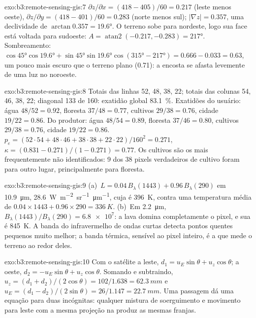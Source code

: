 \begin{solution}{exo:b3:remote-sensing-gis:7}
$\partial z/\partial x = (418 - 405)/60 = 0.217$ (leste menos oeste),
$\partial z/\partial y = (418 - 401)/60 = 0.283$ (norte menos sul);
$|\nabla z| = 0.357$, uma declividade de $\arctan 0.357 = \ang{19.6}$. O terreno
sobe para nordeste, logo sua face está voltada para sudoeste: $A =
\operatorname{atan2}(-0.217, -0.283) = \ang{217}$. Sombreamento: $\cos\ang{45}
\cos\ang{19.6} + \sin\ang{45}\sin\ang{19.6}\cos(\ang{315} - \ang{217}) =
0.666 - 0.033 = 0.63$, um pouco mais escuro que o terreno plano (0.71): a
encosta se afasta levemente de uma luz no noroeste.
\end{solution}

\begin{solution}{exo:b3:remote-sensing-gis:8}
Totais das linhas 52, 48, 38, 22; totais das colunas 54, 46, 38, 22; diagonal 133 de
160: exatidão global \qty{83.1}{\percent}. Exatidões do usuário: água
$48/52 = 0.92$, floresta $37/48 = 0.77$, cultivos $29/38 = 0.76$, cidade
$19/22 = 0.86$. Do produtor: água $48/54 = 0.89$, floresta $37/46 = 0.80$,
cultivos $29/38 = 0.76$, cidade $19/22 = 0.86$. $p_e = (52\cdot54 + 48\cdot46 +
38\cdot38 + 22\cdot22)/160^2 = 0.271$, $\kappa = (0.831 - 0.271)/(1 -
0.271) = 0.77$. Os cultivos são os mais frequentemente não identificados: 9 dos 38 pixels verdadeiros de cultivo
foram para outro lugar, principalmente para floresta.
\end{solution}

\begin{solution}{exo:b3:remote-sensing-gis:9}
(a)~$L = 0.04\,B_\lambda(1443) + 0.96\,B_\lambda(290)$ em
\qty{10.9}{\micro\metre}, \qty{28.6}{W.m^{-2}.sr^{-1}.\micro\metre^{-1}},
cuja  é \qty{396}{K}, contra uma temperatura média de
$0.04\times1443 + 0.96\times290 = \qty{336}{K}$. (b)~Em
\qty{2.2}{\micro\metre}, $B_\lambda(1443)/B_\lambda(290) = \num{6.8e7}$:
a lava domina completamente o pixel, e sua  é
\qty{845}{K}. A banda do infravermelho de ondas curtas detecta pontos quentes pequenos
muito melhor; a banda térmica, sensível ao pixel inteiro, é a que
mede o terreno ao redor deles.
\end{solution}

\begin{solution}{exo:b3:remote-sensing-gis:10}
Com o satélite a leste, $d_1 = u_E\sin\theta + u_z\cos\theta$; a
oeste, $d_2 = -u_E\sin\theta + u_z\cos\theta$. Somando e subtraindo,
$u_z = (d_1 + d_2)/(2\cos\theta) = 102/1.638 = \qty{62.3}{mm}$ e $u_E =
(d_1 - d_2)/(2\sin\theta) = 26/1.147 = \qty{22.7}{mm}$. Uma passagem dá uma
equação para duas incógnitas: qualquer mistura de soerguimento e movimento
para leste com a mesma projeção na  produz as mesmas franjas.
\end{solution}

